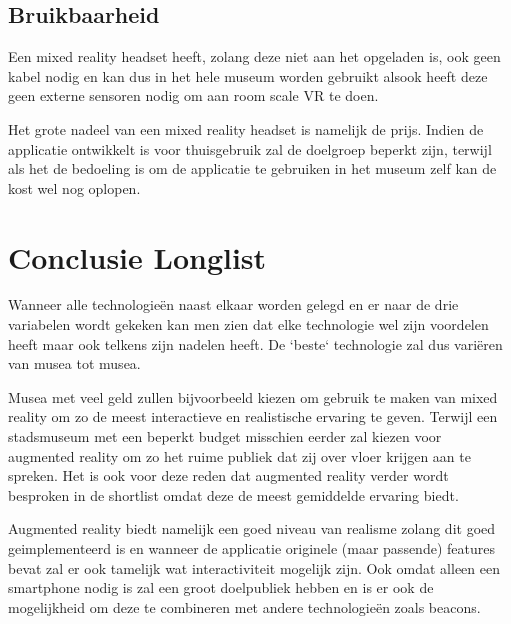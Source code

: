 \subsection{Bruikbaarheid}
Een mixed reality headset heeft, zolang deze niet aan het opgeladen is, ook geen kabel nodig en kan dus in het hele museum worden gebruikt alsook heeft deze geen externe sensoren nodig om aan room scale VR te doen. 

Het grote nadeel van een mixed reality headset is namelijk de prijs. Indien de applicatie ontwikkelt is voor thuisgebruik zal de doelgroep beperkt zijn, terwijl als het de bedoeling is om de applicatie te gebruiken in het museum zelf kan de kost wel nog oplopen.


\section{Conclusie Longlist}
Wanneer alle technologieën naast elkaar worden gelegd en er naar de drie variabelen wordt gekeken kan men zien dat elke technologie wel zijn voordelen heeft maar ook telkens zijn nadelen heeft. De `beste` technologie zal dus variëren van musea tot musea. 

Musea met veel geld zullen bijvoorbeeld kiezen om gebruik te maken van mixed reality om zo de meest interactieve en realistische ervaring te geven. Terwijl een stadsmuseum met een beperkt budget misschien eerder zal kiezen voor augmented reality om zo het ruime publiek dat zij over vloer krijgen aan te spreken. Het is ook voor deze reden dat augmented reality verder wordt besproken in de shortlist omdat deze de meest gemiddelde ervaring biedt.

Augmented reality biedt namelijk een goed niveau van realisme zolang dit goed geimplementeerd is en wanneer de applicatie originele (maar passende) features bevat zal er ook tamelijk wat interactiviteit mogelijk zijn. Ook omdat alleen een smartphone nodig is zal een groot doelpubliek hebben en is er ook de mogelijkheid om deze te combineren met andere technologieën zoals beacons.
